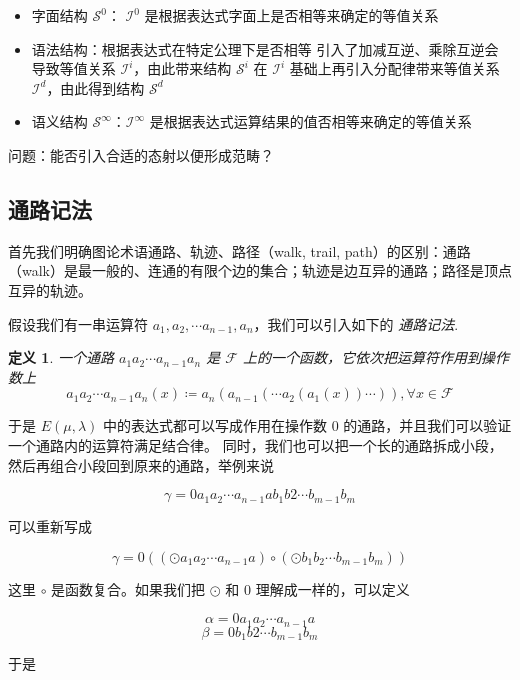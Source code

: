 \documentclass[a4paper,12pt]{article}
\newtheorem{definition}{定义}
\numberwithin{definition}{section}
\numberwithin{lemma}{section}
\numberwithin{proposition}{section}
\numberwithin{theorem}{section}
\numberwithin{grammar}{section}
\numberwithin{program}{section}
\numberwithin{convention}{section}
\numberwithin{corollary}{section}
\begin{document}
\begin{itemize}
    \item 字面结构 $\mathcal{S}^0$： $\mathcal{I}^0$ 是根据表达式字面上是否相等来确定的等值关系
    \item 语法结构：根据表达式在特定公理下是否相等
        \subitem 引入了加减互逆、乘除互逆会导致等值关系 $\mathcal{I}^i$，由此带来结构 $\mathcal{S}^i$
        \subitem 在 $\mathcal{I}^i$ 基础上再引入分配律带来等值关系 $\mathcal{I}^d$，由此得到结构 $\mathcal{S}^d$
    \item 语义结构 $\mathcal{S}^\infty$：$\mathcal{I}^\infty$ 是根据表达式运算结果的值否相等来确定的等值关系
\end{itemize}

问题：能否引入合适的态射以便形成范畴？

\subsection{通路记法}\label{subsec:walknotion}

首先我们明确图论术语通路、轨迹、路径（walk, trail, path）的区别：通路（walk）是最一般的、连通的有限个边的集合；轨迹是边互异的通路；路径是顶点互异的轨迹。

假设我们有一串运算符 $a_1, a_2, \cdots a_{n-1}, a_n$，我们可以引入如下的 \emph{通路记法}.

\begin{definition}
\label{definition:path}
    一个通路 $a_1 a_2 \cdots a_{n-1} a_n$ 是 $\mathcal{F}$ 上的一个函数，它依次把运算符作用到操作数上
    $$a_1 a_2 \cdots a_{n-1} a_n (x) \coloneqq a_n( a_{n-1}( \cdots a_2( a_1(x) ) \cdots ) ), \forall x \in \mathcal{F}$$
\end{definition}

于是 $E(\mu, \lambda)$ 中的表达式都可以写成作用在操作数 $0$ 的通路，并且我们可以验证一个通路内的运算符满足结合律。
同时，我们也可以把一个长的通路拆成小段，然后再组合小段回到原来的通路，举例来说

$$\gamma = 0 a_1 a_2 \cdots a_{n-1} a b_1 b2 \cdots b_{m-1} b_m$$

可以重新写成

$$\gamma = 0 ((\odot a_1 a_2 \cdots a_{n-1} a) \circ (\odot b_1 b_2 \cdots b_{m-1} b_m))$$

这里 $\circ$ 是函数复合。如果我们把 $\odot$ 和 $0$ 理解成一样的，可以定义

$$\alpha = 0 a_1 a_2 \cdots a_{n-1} a$$
$$\beta = 0 b_1 b2 \cdots b_{m-1} b_m$$

于是
\end{document}
